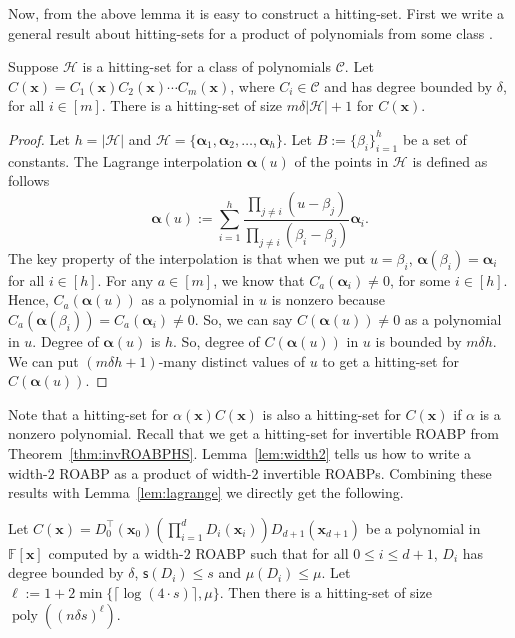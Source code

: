 \documentclass[final,oneeqnum, onethmnum, onefignum]{siamltex1213}
\newcommand{\F}{\mathbb F}
\newcommand{\abs}[1]{\lvert #1 \rvert}
\newcommand{\ceil}[1]{\lceil #1 \rceil}
\newcommand{\C}{\mathcal C}
\newcommand{\Hit}{\mathcal{H}} %
\DeclareMathOperator{\poly}{poly}
\renewcommand{\sp}{\mathsf{s}} %
\renewcommand{\o}[1]{\overline{#1}}
\begin{document}
Now, from the above lemma it is easy to construct a hitting-set. 
First we write a general result about hitting-sets
for a product of polynomials from some class \cite[Observation 4.1]{SY10}.
\begin{lemma}
\label{lem:lagrange}
Suppose $\Hit$ is a hitting-set for a class of polynomials $\C$.
Let $C(\mathbf{x}) = C_1(\mathbf{x}) C_2(\mathbf{x}) \dotsm C_m(\mathbf{x})$,
where $C_i \in \C$ and has degree bounded by $\delta$, for all $i \in [m]$.
There is a hitting-set of size $m \delta \abs{\Hit} +1$ for $C(\mathbf{x})$.
\end{lemma}
\begin{proof}
Let $h = \abs{\Hit}$  and 
$\Hit = \{ \mathbf{\alpha}_1, \mathbf{\alpha}_2, \dots, \mathbf{\alpha}_{h} \}$.
Let $B := \{\beta_i\}_{i=1}^{h}$ be a set of constants.
The Lagrange interpolation $\mathbf{\alpha}(u)$ of the points in $\Hit$ is defined
as follows 
$$ \mathbf{\alpha}(u) := \sum_{i=1}^{h} \frac{\prod_{j \neq i} (u - \beta_j) }{\prod_{j \neq i} (\beta_i - \beta_j) } \mathbf{\alpha}_i . 
$$
The key property of the interpolation is that 
when we put $u = \beta_i$,
$\mathbf{\alpha}(\beta_i) = \mathbf{\alpha}_i$ for all $i \in [h]$.
For any $a \in [m]$, we know that 
$C_a(\mathbf{\alpha}_i) \neq 0$, for some $i \in [h]$. 
Hence, $C_a(\mathbf{\alpha}(u))$ as a polynomial in $u$ is nonzero 
because $C_a(\mathbf{\alpha}(\beta_i)) = C_a(\mathbf{\alpha}_i) \neq 0$.
So, we can say $C(\mathbf{\alpha}(u)) \neq 0$ as a polynomial in $u$. 
Degree of $\mathbf{\alpha}(u)$ is $h$. So, degree of $C(\mathbf{\alpha}(u))$
in $u$ is bounded by $m \delta h$. 
We can put $(m \delta h +1)$-many distinct values of $u$ 
to get a hitting-set for $C(\mathbf{\alpha}(u))$.
\end{proof}

Note that a hitting-set for $\alpha(\mathbf{x}) C(\mathbf{x})$ is also 
a hitting-set for $C(\mathbf{x})$ if $\alpha$ is a nonzero polynomial.
Recall that we get a hitting-set for invertible ROABP from
 Theorem~\ref{thm:invROABPHS}. %
Lemma~\ref{lem:width2} tells us how to 
write a width-$2$ ROABP as a product of width-$2$ invertible ROABPs. 
Combining these results with Lemma~\ref{lem:lagrange}
we directly get the following. 

\begin{theorem}
\label{thm:ROABP22HS}
Let $C(\mathbf{x}) = D_0^{\top}(\mathbf{x}_0) (\prod_{i=1}^{d} D_i(\mathbf{x}_i)) D_{d+1}(\mathbf{x}_{d+1})$
be a polynomial 
in $\F[\mathbf{x}]$ computed by a width-$2$ ROABP
 such that for all $0 \leq i \leq d+1$,
 $D_i$ has degree bounded
by $\delta$, $\sp(D_i) \leq s$ and $\mu(D_i) \leq \mu$.
Let $\ell := 1 + 2 \min\{ \ceil{\log (4 \cdot s)}, \mu \}$.
Then there is a hitting-set of size
$\poly((n \delta s)^{\ell})$.
\end{theorem} 
\end{document}
